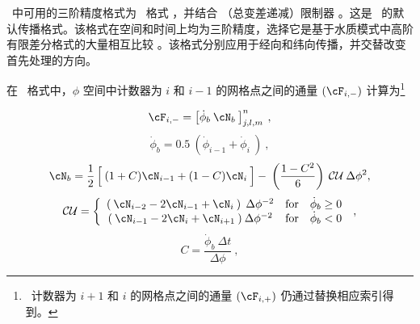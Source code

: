 
\vspace{\baselineskip}
\vspace{\baselineskip} 


\noindent 
\ws\ 中可用的三阶精度格式为 \qck\ 格式 \citep{art:Leo79,art:DM82}，并结合 \ult{} \tvd{}（总变差递减）限制器 \citep{art:Leo91}。这是 \ws\ 的默认传播格式。该格式在空间和时间上均为三阶精度，选择它是基于水质模式中高阶有限差分格式的大量相互比较 \citep[见][]{PhD:Cah,pro:FC93,tol:OMB95}。该格式分别应用于经向和纬向传播，并交替改变首先处理的方向。

在 \qck\ 格式中，$\phi$ 空间中计数器为 $i$ 和 $i-1$ 的网格点之间的通量 $(\cF_{i,-})$ 计算为\footnote{~计数器为 $i+1$ 和 $i$ 的网格点之间的通量 $(\cF_{i,+})$ 仍通过替换相应索引得到。}


\begin{equation}
\cF_{i,-} = \left [ \dot{\phi}_b \: \cN_b \: \right ]^n_{j,l,m} \: , \label{eq:quick_1}
\end{equation} \begin{equation}
\dot{\phi}_b = 0.5 \: \left ( \dot{\phi}_{i-1} + \dot{\phi}_i 
\: \right ) \: , \label{eq:quick_1a}
\end{equation}  \begin{equation}
\cN_b = \frac{1}{2} \left [ \rule[0mm]{0mm}{\baselineskip} \: 
(1+C)\cN_{i-1} + (1-C)\cN_i \: \right ] - \:
\left ( \frac{1-C^2}{6} \right ) \: {\cal CU} \: \Delta\phi^2, \label{eq:quick_2} \end{equation} \begin{equation}
{\cal CU} =  \left \{ \begin{array}{ccc}
(\: \cN_{i-2} - 2\cN_{i-1} + \cN_{i} \:)\: \: \Delta \phi^{-2}
               & \mbox{for} & \dot{\phi}_b \geq 0 \\
(\: \cN_{i-1} - 2\cN_{i} + \cN_{i+1} \:)\: \Delta \phi^{-2}
               & \mbox{for} & \dot{\phi}_b   <  0
\end{array} \right . \: , \label{eq:quick_3}
\end{equation} \begin{equation}
C = \frac{\dot{\phi}_b \: \Delta t}{\Delta \phi} 
\: , \label{eq:quick_4} \end{equation}

